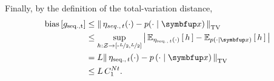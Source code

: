 \begin{proofEnd}
  Finally, by the definition of the total-variation distance, 
 \begin{align}
   \mathrm{bias}\left[ g_{\mathrm{seq., t}} \right]
   &\leq \DTV{\eta_{seq.,\, t}(\cdot)}{p(\cdot\mid\vx)} \\
   &\leq \sup_{h : \mathcal{Z} \rightarrow \left[ \text{-}\nicefrac{L}{2}, \nicefrac{L}{2} \right]} \left|\, \Esub{\eta_{\mathrm{seq.},\, t}(\cdot)}{h} - \Esub{p(\cdot\mid\vx)}{h} \,\right| \\
   &= L \DTV{ \eta_{\mathrm{seq.},\, t}(\cdot) }{p\left(\cdot\mid\vx\right)}  \\
   &\leq L \, C_1^{N t}.
 \end{align}
\end{proofEnd}

